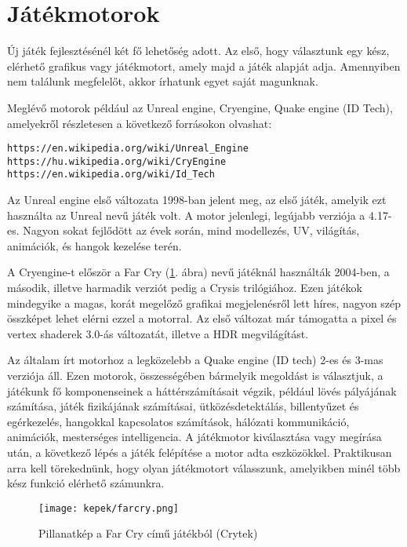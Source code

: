 \label{Chap:problemakor}

\section{Játékmotorok}

Új játék fejlesztésénél két fő lehetőség adott. Az első, hogy választunk egy kész, elérhető grafikus vagy játékmotort, amely majd a játék alapját adja. Amennyiben nem találunk megfelelőt, akkor írhatunk egyet saját magunknak.

Meglévő motorok például az Unreal engine, Cryengine, Quake engine (ID Tech), amelyekről részletesen a következő forrásokon olvashat:
\begin{verbatim}
https://en.wikipedia.org/wiki/Unreal_Engine
https://hu.wikipedia.org/wiki/CryEngine
https://en.wikipedia.org/wiki/Id_Tech
\end{verbatim}

Az Unreal engine első változata 1998-ban jelent meg, az első játék, amelyik ezt használta az Unreal nevű játék volt. A motor jelenlegi, legújabb verziója a 4.17-es. Nagyon sokat fejlődött az évek során, mind modellezés, UV, világítás, animációk, és hangok kezelése terén.

A Cryengine-t először a Far Cry (\ref{fig:farcry}. ábra) nevű játéknál használták 2004-ben, a második, illetve harmadik verziót pedig a Crysis trilógiához. Ezen játékok mindegyike a magas, korát megelőző grafikai megjelenésről lett híres, nagyon szép összképet lehet elérni ezzel a motorral. Az első változat már támogatta a pixel és vertex shaderek 3.0-ás változatát, illetve a HDR megvilágítást.

Az általam írt motorhoz a legközelebb a Quake engine (ID tech) 2-es és 3-mas verziója áll. Ezen motorok, összességében bármelyik megoldást is választjuk, a játékunk fő komponenseinek a háttérszámításait végzik, például lövés pályájának számítása, játék fizikájának számításai, ütközésdetektálás, billentyűzet és egérkezelés, hangokkal kapcsolatos számítások, hálózati kommunikáció, animációk, mesterséges intelligencia. A játékmotor kiválasztása vagy megírása után, a következő lépés a játék felépítése a motor adta eszközökkel. Praktikusan arra kell törekednünk, hogy olyan játékmotort válasszunk, amelyikben minél több kész funkció elérhető számunkra.

\begin{figure}[h]
\centering
\texttt{[image: kepek/farcry.png]}
\caption{Pillanatkép a Far Cry című játékból (Crytek)}
\label{fig:farcry}
\end{figure}

